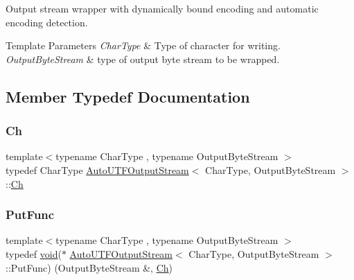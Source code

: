 Output stream wrapper with dynamically bound encoding and automatic encoding detection. 


\begin{DoxyTemplParams}{Template Parameters}
{\em Char\+Type} & Type of character for writing. \\
\hline
{\em Output\+Byte\+Stream} & type of output byte stream to be wrapped. \\
\hline
\end{DoxyTemplParams}


\subsection{Member Typedef Documentation}
\mbox{\label{classAutoUTFOutputStream_abd8c486101026e11828e86c18991c9c0}} 
\subsubsection{\texorpdfstring{Ch}{Ch}}
{\footnotesize\ttfamily template$<$typename Char\+Type , typename Output\+Byte\+Stream $>$ \\
typedef Char\+Type \hyperlink{classAutoUTFOutputStream}{Auto\+U\+T\+F\+Output\+Stream}$<$ Char\+Type, Output\+Byte\+Stream $>$\+::\hyperlink{classAutoUTFOutputStream_abd8c486101026e11828e86c18991c9c0}{Ch}}

\mbox{\label{classAutoUTFOutputStream_a398450792738ee1cb865fc96dfde9e1a}} 
\subsubsection{\texorpdfstring{Put\+Func}{PutFunc}}
{\footnotesize\ttfamily template$<$typename Char\+Type , typename Output\+Byte\+Stream $>$ \\
typedef \hyperlink{imgui__impl__opengl3__loader_8h_ac668e7cffd9e2e9cfee428b9b2f34fa7}{void}($\ast$ \hyperlink{classAutoUTFOutputStream}{Auto\+U\+T\+F\+Output\+Stream}$<$ Char\+Type, Output\+Byte\+Stream $>$\+::Put\+Func) (Output\+Byte\+Stream \&, \hyperlink{classAutoUTFOutputStream_abd8c486101026e11828e86c18991c9c0}{Ch})\hspace{0.3cm}{\ttfamily [private]}}



